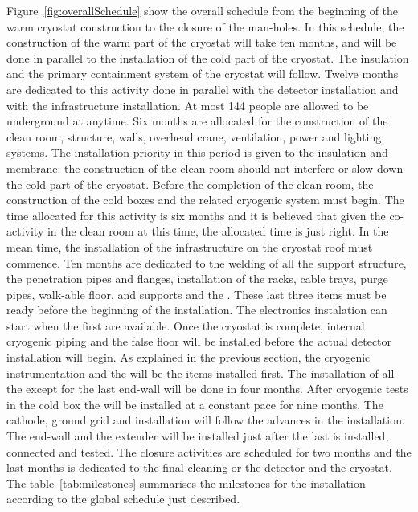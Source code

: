 Figure~\ref{fig:overallSchedule} show the overall schedule from the beginning of the warm cryostat construction to the closure of the man-holes.
In this schedule, the construction of the warm part of the  cryostat will take ten months, and will be done in parallel to the installation of the cold part of the  cryostat.
The insulation and the primary containment system of the  cryostat will follow.
Twelve months are dedicated to this activity done in parallel with the  detector installation and with the  infrastructure installation.
At most 144 people are allowed to be underground at anytime.
Six months are allocated for the construction of the clean room, structure, walls, overhead crane, ventilation, power and lighting systems. 
The installation priority in this period is given to the insulation and membrane: the construction of the clean room should not interfere or slow down the cold part of the cryostat.
Before the completion of the clean room, the construction of the cold boxes and the related cryogenic system must begin.
The time allocated for this activity is six months and it is believed that given the co-activity in the clean room at this time, the allocated time is just right.
In the mean time, the installation of the infrastructure on the cryostat roof must commence.
Ten months are dedicated to the welding of all the support structure, the penetration pipes and flanges, installation of the racks, cable trays, purge pipes, walk-able floor,  and  supports and the .
These last three items must be ready before the beginning of the  installation.
The electronics instalation can start when the first  are available.
Once the cryostat is complete, internal cryogenic piping and the false floor will be installed before the actual detector installation will begin.
As explained in the previous section, the cryogenic instrumentation and the  will be the items installed first.
The installation of all the  except for the last end-wall will be done in four months.
After cryogenic tests in the cold box the  will be installed at a constant pace for nine months.
The cathode, ground grid and  installation will follow the advances in the  installation.
The  end-wall and the  extender will be installed just after the last  is installed, connected and tested.
The  closure activities are scheduled for two months and the last months is dedicated to the final cleaning or the detector and the cryostat.
The table~\ref{tab:milestones} summarises the milestones for the  installation according to the global schedule just described.



